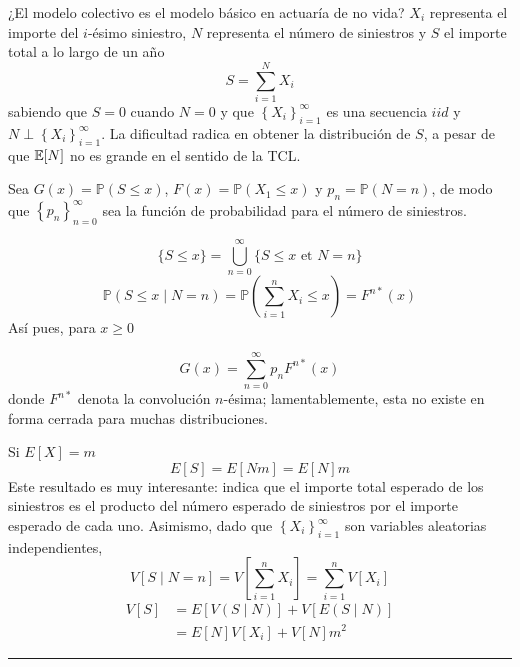 \begin{f}
	¿El modelo colectivo es el modelo básico en actuaría de no vida?
	\(X_{i}\) representa el importe del \(i\)-ésimo siniestro, \(N\) representa el número de siniestros y \(S\) el importe total a lo largo de un año
	\[
	S=\sum_{i=1}^{N} X_{i}
	\]
	sabiendo que \(S=0\) cuando \(N=0\) y que \(\left\{X_{i}\right\}_{i=1}^{\infty}\) es una secuencia \(iid\) y \(N \perp \left\{X_{i}\right\}_{i=1}^{\infty}\). 
	La dificultad radica en obtener la distribución de \(S\), a pesar de que \(\mathbb{E} [N]\) no es grande en el sentido de la TCL.
\end{f}



\begin{f}[La distribución de \(S\)]
	
	Sea \(G(x)=\mathbb{P}(S \leq x)\), \(F(x)=\mathbb{P}\left(X_{1} \leq x\right)\) y \(p_{n}=\mathbb{P}(N=n)\), de modo que \(\left\{p_{n}\right\}_{n=0}^{\infty}\) sea la función de probabilidad para el número de siniestros.
	
	\[
	\{S \leq x\}=\bigcup_{n=0}^{\infty}\{S \leq x \text { et } N=n\}
	\]
	\[
	\mathbb{P}(S \leq x \mid N=n)=\mathbb{P}\left(\sum_{i=1}^{n} X_{i} \leq x\right)=F^{n *}(x)
	\]
	Así pues, para \(x \geq 0\)
	
	\begin{equation*}\label{GxCollectif}
		G(x)=\sum_{n=0}^{\infty} p_{n} F^{n *}(x)
	\end{equation*}
	donde \(F^{n *}\) denota la convolución \(n\)-ésima; lamentablemente, esta no existe en forma cerrada para muchas distribuciones.    
	
	Si \(E[X]=m\)
	\[
	E[S]=E\left[N m\right]=E[N] m
	\]
	Este resultado es muy interesante: indica que el importe total esperado de los siniestros es el producto del número esperado de siniestros por el importe esperado de cada uno. Asimismo, dado que \(\left\{X_{i}\right\}_{i=1}^{\infty}\) son variables aleatorias independientes,
	\[
	V[S \mid N=n]=V\left[\sum_{i=1}^{n} X_{i}\right]=\sum_{i=1}^{n} V\left[X_{i}\right]
	\]
	\[
	\begin{aligned}
		V[S] &=E[V(S \mid N)]+V[E(S \mid N)] \\
		&=E[N] V\left[X_{i}\right]+V[N] m^{2}
	\end{aligned}
	\]    
\end{f}

\hrule


